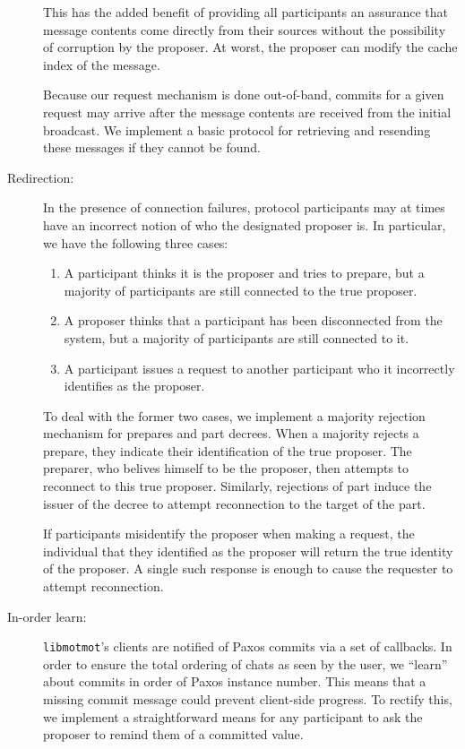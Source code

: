 \documentclass{sig-alternate}
\newcommand\libmotmot{\texttt{libmotmot}\xspace}
\begin{document}
\begin{description}
    This has the added benefit of providing all participants an assurance that
    message contents come directly from their sources without the possibility
    of corruption by the proposer.  At worst, the proposer can modify the
    cache index of the message.

    Because our request mechanism is done out-of-band, commits for a given
    request may arrive after the message contents are received from the initial
    broadcast.  We implement a basic protocol for retrieving and resending
    these messages if they cannot be found.

  \item[Redirection:]
    In the presence of connection failures, protocol participants may at times
    have an incorrect notion of who the designated proposer is.  In particular,
    we have the following three cases:
    \begin{enumerate}
      \item A participant thinks it is the proposer and tries to prepare, but
        a majority of participants are still connected to the true proposer.
      \item A proposer thinks that a participant has been disconnected from
        the system, but a majority of participants are still connected to it.
      \item A participant issues a request to another participant who it
        incorrectly identifies as the proposer.
    \end{enumerate}
    To deal with the former two cases, we implement a majority rejection
    mechanism for prepares and part decrees.  When a majority rejects a
    prepare, they indicate their identification of the true proposer.
    The preparer, who belives himself to be the proposer, then attempts
    to reconnect to this true proposer.  Similarly, rejections of part
    induce the issuer of the decree to attempt reconnection to the target
    of the part.

    If participants misidentify the proposer when making a request, the
    individual that they identified as the proposer will return the true
    identity of the proposer.  A single such response is enough to cause
    the requester to attempt reconnection.

  \item[In-order learn:]
    \libmotmot's clients are notified of Paxos commits via a set of callbacks.
    In order to ensure the total ordering of chats as seen by the user, we
    ``learn'' about commits in order of Paxos instance number.  This means that
    a missing commit message could prevent client-side progress.  To rectify
    this, we implement a straightforward means for any participant to ask the
    proposer to remind them of a committed value.


\end{description}
\end{document}
